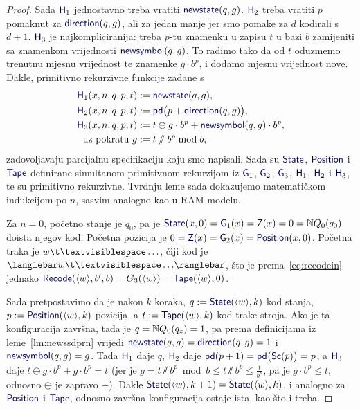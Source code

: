 \begin{proof}
Sada $\f H_1$ jednostavno treba vratiti $\f{newstate}(q,g)$. $\f H_2$ treba vratiti $p$ pomaknut za $\f{direction}(q,g)$, ali za jedan manje jer smo pomake za $d$ kodirali s $d+1$. $\f H_3$ je najkompliciranija: treba $p$-tu znamenku u zapisu $t$ u bazi $b$ zamijeniti sa znamenkom vrijednosti $\f{newsymbol}(q,g)$. To radimo tako da od $t$ oduzmemo trenutnu mjesnu vrijednost te znamenke $g\cdot b^p$, i dodamo mjesnu vrijednost nove. Dakle, primitivno rekurzivne funkcije zadane s
\begin{align}
    \f H_1(x,n,q,p,t)&:=\f{newstate}(q,g)\text,\\
    \f H_2(x,n,q,p,t)&:=\f{pd}\bigl(p+\f{direction}(q,g)\bigr)\text,\\
    \f H_3(x,n,q,p,t)&:=t\ominus g\cdot b^p+\f{newsymbol}(q,g)\cdot b^p\text,\\
    \text{uz pokratu }g&:=t\sslash b^p\bmod b\text,
\end{align}
zadovoljavaju parcijalnu specifikaciju koju smo napisali. Sada su $\f{State}$, $\f{Position}$ i $\f{Tape}$ definirane simultanom primitivnom rekurzijom iz $\f G_1$, $\f G_2$, $\f G_3$, $\f H_1$, $\f H_2$ i $\f H_3$, te su primitivno rekurzivne. Tvrdnju leme sada dokazujemo matematičkom indukcijom po $n$, sasvim analogno kao u RAM-modelu.

Za $n=0$, početno stanje je $q_0$, pa je $\f{State}(x,0)=\f G_1(x)=\f Z(x)=0=\N Q_0(q_0)$ doista njegov kod. Početna pozicija je $0=\f Z(x)=\f G_2(x)=\f{Position}(x,0)$. Početna traka je $w\bl\ldots$, čiji kod je $\knk{w\bl\ldots}$, što je prema~\eqref{eq:recodein} jednako $\f{Recode}(\kr w,b',b)=G_3(\kr w)=\f{Tape}(\kr w,0)$.

Sada pretpostavimo da je nakon $k$ koraka, $q:=\f{State}(\kr w,k)$ kod stanja, $p:=\f{Position}(\kr w,k)$ pozicija, a $t:=\f{Tape}(\kr w,k)$ kod trake stroja. Ako je ta konfiguracija završna, tada je $q={\mathbb N} Q_0(q_z)=1$, pa prema definicijama iz leme~\ref{lm:newssdprn} vrijedi $\f{newstate}(q,g)=\f{direction}(q,g)=1$ i $\f{newsymbol}(q,g)=g$. Tada $\f H_1$ daje $q$, $\f H_2$ daje $\f{pd}(p+1)=\f{pd}\bigl(\f{Sc}(p)\bigr)=p$, a $\f H_3$ daje $t\ominus g\cdot b^p+g\cdot b^p=t$ (jer je $g=t\sslash b^p\bmod b\le t\sslash b^p\le\frac{t}{b^p}$, pa je $g\cdot b^p\le t$, odnosno $\ominus$ je zapravo $-$). Dakle $\f{State}(\kr w,k+1)=\f{State}(\kr w,k)$, i analogno za $\f{Position}$ i $\f{Tape}$, odnosno završna konfiguracija ostaje ista, kao što i treba.


\end{proof}
